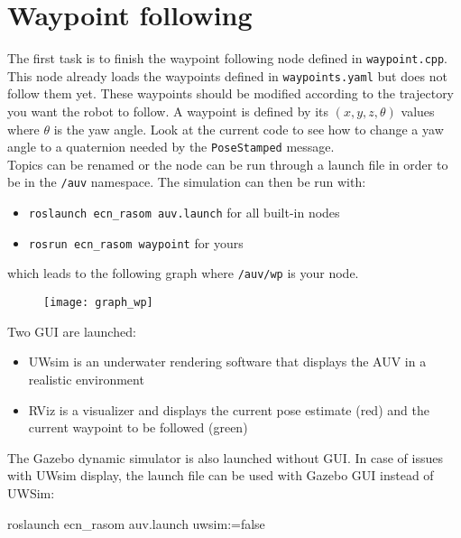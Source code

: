 \documentclass{ecnreport}
\begin{document}
%

\section{Waypoint following}

The first task is to finish the waypoint following node defined in \texttt{waypoint.cpp}. This node already loads the waypoints defined in \texttt{waypoints.yaml} but does not follow them yet.
These waypoints should be modified according to the trajectory you want the robot to follow. A waypoint is defined by its $(x,y,z,\theta)$ values where $\theta$ is the yaw angle. Look at the current
code to see how to change a yaw angle to a quaternion needed by the \texttt{PoseStamped} message.\\

Topics can be renamed or the node can be run through a launch file in order to be in the \texttt{/auv} namespace.
The simulation can then be run with:
\begin{itemize}
 \item \texttt{roslaunch ecn\_rasom auv.launch} for all built-in nodes
 \item \texttt{rosrun ecn\_rasom waypoint} for yours
\end{itemize}
which leads to the following graph where \texttt{/auv/wp} is your node.
\begin{figure}[h]\centering
 \texttt{[image: graph\_wp]}
\end{figure}

Two GUI are launched: 
\begin{itemize}
 \item UWsim is an underwater rendering software that displays the AUV in a realistic environment
 \item RViz is a visualizer and displays the current pose estimate (red) and the current waypoint to be followed (green)
\end{itemize}
The Gazebo dynamic simulator is also launched without GUI. In case of issues with UWsim display, the launch file can be used with Gazebo GUI instead of UWSim:
\begin{bashcodelarge}
roslaunch ecn_rasom auv.launch uwsim:=false
  \end{bashcodelarge}
\end{document}

